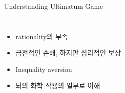 \documentclass[final]{beamer}
\begin{document}
\begin{frame}[t]{Understanding Ultimatum Game}
	\begin{columns}[c]
	\column{15em}
	\begin{itemize}
		\item rationality의 부족 
		\item 금전적인 손해, 하지만 심리적인 보상 
		\item Inequality aversion 
		\item 뇌의 화학 작용의 일부로 이해 
	\end{itemize}
	\column{15em} 
	\end{columns}
\end{frame}
\end{document}
